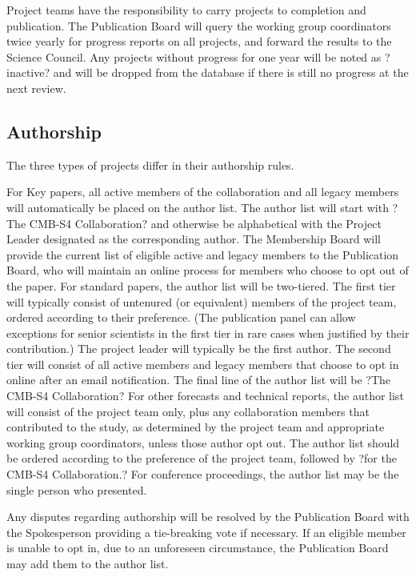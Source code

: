 Project teams have the responsibility to carry projects to completion and publication.  The Publication Board will query the working group coordinators twice yearly for progress reports on all projects, and forward the results to the Science Council.  Any projects without progress for one year will be noted as ?inactive? and will be dropped from the database if there is still no progress at the next review.

\subsection{Authorship}

The three types of projects differ in their authorship rules.

For Key papers, all active members of the collaboration and all legacy members will automatically be placed on the author list.  The author list will start with ?The CMB-S4 Collaboration? and otherwise be alphabetical with the Project Leader designated as the corresponding author.  The Membership Board will provide the current list of eligible active and legacy members to the Publication Board, who will maintain an online process for members who choose to opt out of the paper.
For standard papers, the author list will be two-tiered.  The first tier will typically consist of untenured (or equivalent) members of the project team, ordered according to their preference.  (The publication panel can allow exceptions for senior scientists in the first tier in rare cases when justified by their contribution.)  The project leader will typically be the first author.  The second tier will consist of all active members and legacy members that choose to opt in online after an email notification.  The final line of the author list will be ?The CMB-S4 Collaboration?
For other forecasts and technical reports, the author list will consist of the project team only, plus any collaboration members that contributed to the study, as determined by the project team and appropriate working group coordinators, unless those author opt out.  The author list should be ordered according to the preference of the project team, followed by ?for the CMB-S4 Collaboration.?  For conference proceedings, the author list may be the single person who presented.

Any disputes regarding authorship will be resolved by the Publication Board with the Spokesperson providing a tie-breaking vote if necessary.  If an eligible member is unable to opt in, due to an unforeseen circumstance, the Publication Board may add them to the author list.

